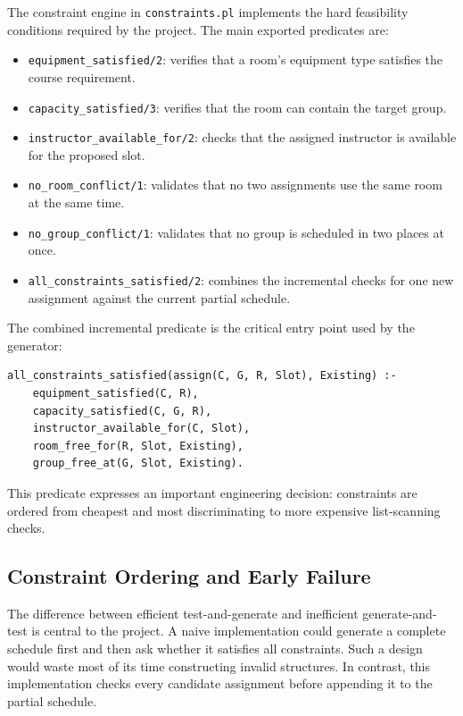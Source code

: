 \documentclass[12pt,a4paper]{article}
\newcommand{\predicate}[1]{\texttt{#1}}
\begin{document}
The constraint engine in \predicate{constraints.pl} implements the hard feasibility conditions required by the project. The main exported predicates are:

\begin{itemize}
    \item \predicate{equipment\_satisfied/2}: verifies that a room's equipment type satisfies the course requirement.
    \item \predicate{capacity\_satisfied/3}: verifies that the room can contain the target group.
    \item \predicate{instructor\_available\_for/2}: checks that the assigned instructor is available for the proposed slot.
    \item \predicate{no\_room\_conflict/1}: validates that no two assignments use the same room at the same time.
    \item \predicate{no\_group\_conflict/1}: validates that no group is scheduled in two places at once.
    \item \predicate{all\_constraints\_satisfied/2}: combines the incremental checks for one new assignment against the current partial schedule.
\end{itemize}

The combined incremental predicate is the critical entry point used by the generator:

\begin{lstlisting}[caption={Incremental constraint checking order}]
all_constraints_satisfied(assign(C, G, R, Slot), Existing) :-
    equipment_satisfied(C, R),
    capacity_satisfied(C, G, R),
    instructor_available_for(C, Slot),
    room_free_for(R, Slot, Existing),
    group_free_at(G, Slot, Existing).
\end{lstlisting}

This predicate expresses an important engineering decision: constraints are ordered from cheapest and most discriminating to more expensive list-scanning checks.

\subsection{Constraint Ordering and Early Failure}

The difference between efficient test-and-generate and inefficient generate-and-test is central to the project. A naive implementation could generate a complete schedule first and then ask whether it satisfies all constraints. Such a design would waste most of its time constructing invalid structures. In contrast, this implementation checks every candidate assignment before appending it to the partial schedule.
\end{document}
